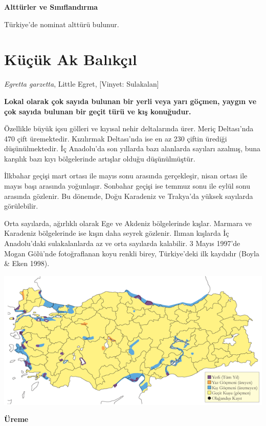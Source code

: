 \documentclass[
  letterpaper,
  DIV=11,
  numbers=noendperiod]{scrreprt}
\begin{document}
\textbf{Alttürler ve Sınıflandırma}

Türkiye'de nominat alttürü bulunur.

\section{Küçük Ak Balıkçıl}\label{kuxfcuxe7uxfck-ak-balux131kuxe7ux131l}

\emph{Egretta garzetta}, Little Egret, {[}Vinyet: Sulakalan{]}

\textbf{Lokal olarak çok sayıda bulunan bir yerli veya yarı göçmen,
yaygın ve çok sayıda bulunan bir geçit türü ve kış konuğudur.}

Özellikle büyük içsu gölleri ve kıyısal nehir deltalarında ürer. Meriç
Deltası'nda 470 çift üremektedir. Kızılırmak Deltası'nda ise en az 230
çiftin ürediği düşünülmektedir. İç Anadolu'da son yıllarda bazı
alanlarda sayıları azalmış, buna karşılık bazı kıyı bölgelerinde
artışlar olduğu düşünülmüştür.

İlkbahar geçişi mart ortası ile mayıs sonu arasında gerçekleşir, nisan
ortası ile mayıs başı arasında yoğunlaşır. Sonbahar geçişi ise temmuz
sonu ile eylül sonu arasında gözlenir. Bu dönemde, Doğu Karadeniz ve
Trakya'da yüksek sayılarda görülebilir.

Orta sayılarda, ağırlıklı olarak Ege ve Akdeniz bölgelerinde kışlar.
Marmara ve Karadeniz bölgelerinde ise kışın daha seyrek gözlenir. Ilıman
kışlarda İç Anadolu'daki sulakalanlarda az ve orta sayılarda kalabilir.
3 Mayıs 1997'de Mogan Gölü'nde fotoğraflanan koyu renkli birey,
Türkiye'deki ilk kaydıdır (Boyla \& Eken 1998).

\includegraphics{images/harita_Page_072.png}

\textbf{Üreme}
\end{document}
